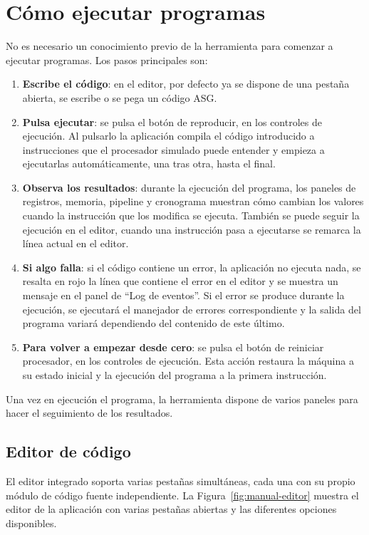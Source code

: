 \documentclass[../main.tex]{subfiles}
\begin{document}
\section{Cómo ejecutar programas}

No es necesario un conocimiento previo de la herramienta para comenzar a ejecutar programas. Los pasos principales son:

\begin{enumerate}
	\item \textbf{Escribe el código}: en el editor, por defecto ya se dispone de una pestaña abierta, se escribe o se pega un código ASG.
	\item \textbf{Pulsa ejecutar}: se pulsa el botón de reproducir, en los controles de ejecución. Al pulsarlo la aplicación compila el código introducido a instrucciones que el procesador simulado puede entender y empieza a ejecutarlas automáticamente, una tras otra, hasta el final.
	\item \textbf{Observa los resultados}: durante la ejecución del programa, los paneles de registros, memoria, pipeline y cronograma muestran cómo cambian los valores cuando la instrucción que los modifica se ejecuta. También se puede seguir la ejecución en el editor, cuando una instrucción pasa a ejecutarse se remarca la línea actual en el editor.
	\item \textbf{Si algo falla}: si el código contiene un error, la aplicación no ejecuta nada, se resalta en rojo la línea que contiene el error en el editor y se muestra un mensaje en el panel de ``Log de eventos''. Si el error se produce durante la ejecución, se ejecutará el manejador de errores correspondiente y la salida del programa variará dependiendo del contenido de este último.
	\item \textbf{Para volver a empezar desde cero}: se pulsa el botón de reiniciar procesador, en los controles de ejecución. Esta acción restaura la máquina a su estado inicial y la ejecución del programa a la primera instrucción.
\end{enumerate}

Una vez en ejecución el programa, la herramienta dispone de varios paneles para hacer el seguimiento de los resultados.

\subsection{Editor de código}

El editor integrado soporta varias pestañas simultáneas, cada una con su propio módulo de código fuente independiente. La Figura~\ref{fig:manual-editor} muestra el editor de la aplicación con varias pestañas abiertas y las diferentes opciones disponibles.
\end{document}
